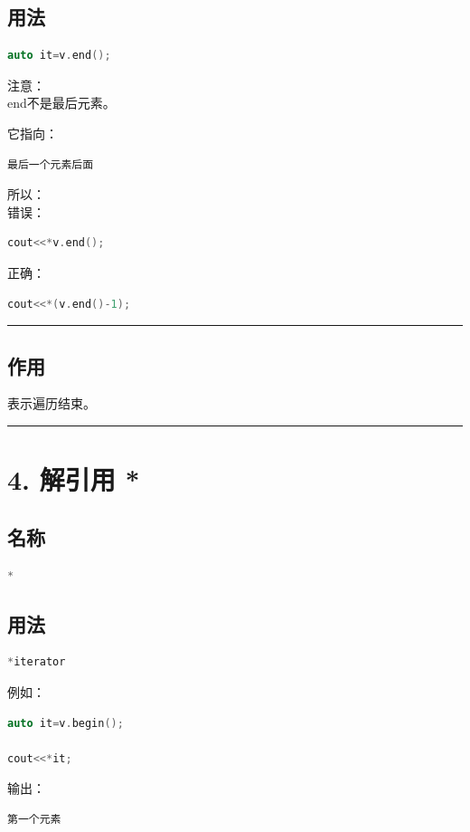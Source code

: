 \documentclass[9pt,twocolumn]{extarticle}
\begin{document}
\subsection{用法}
\begin{lstlisting}[language=C++]
auto it=v.end();
\end{lstlisting}
注意：\\
end不是最后元素。

它指向：
\begin{lstlisting}
最后一个元素后面
\end{lstlisting}
所以：\\
错误：
\begin{lstlisting}[language=C++]
cout<<*v.end();
\end{lstlisting}
正确：
\begin{lstlisting}[language=C++]
cout<<*(v.end()-1);
\end{lstlisting}

\noindent\rule{\linewidth}{0.4pt}

\subsection{作用}
表示遍历结束。

\noindent\rule{\linewidth}{0.4pt}

\section{4. 解引用 *}

\subsection{名称}
\begin{lstlisting}[language=C++]
*
\end{lstlisting}

\subsection{用法}
\begin{lstlisting}[language=C++]
*iterator
\end{lstlisting}
例如：
\begin{lstlisting}[language=C++]
auto it=v.begin();

cout<<*it;
\end{lstlisting}
输出：
\begin{lstlisting}
第一个元素
\end{lstlisting}
\end{document}
